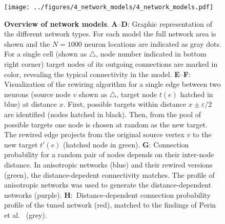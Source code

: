 
\begin{figure}[h]
    \vspace{0.25cm}
  \texttt{[image: ../figures/4\_network\_models/4\_network\_models.pdf]} %
  \vspace{0.15cm}
  \caption{{\bf Overview of network models}. \textbf{A}--\textbf{D}:
    Graphic representation of the different network types. For each
    model the full network area is shown and the $N=1000$ neuron
    locations are indicated as gray dots. For a single cell (shown as
    $\bigtriangleup$, node number indicated in bottom right corner)
    target nodes of its outgoing connections are marked in color,
    revealing the typical connectivity in the model. %
    \textbf{E}--\textbf{F}: Visualization of the rewiring algorithm
    for a single edge between two neurons (source node $v$ shown as
    $\bigtriangleup$, target node $t(e)$ hatched in blue) at distance
    $x$. First, possible targets within distance $x \pm \varepsilon/2$
    are identified (nodes hatched in black). Then, from the pool of
    possible targets one node is chosen at random as the new
    target. The rewired edge projects from the original source vertex
    $v$ to the new target $t'(e)$ (hatched node in green). \textbf{G}:
    Connection probability for a random pair of nodes depends on their
    inter-node distance. In anisotropic networks (blue) and their
    rewired versions (green), the distance-depedent connectivity
    matches. The profile of anisotropic networks was used to generate
    the distance-dependent networks
    (purple). \textbf{H}:~Distance-dependent connection probability
    profile of the tuned network (red), matched to the findings of
    Perin et al.~\cite{Perin2011} (grey).}
\label{fig:4_net_models}
\end{figure}
